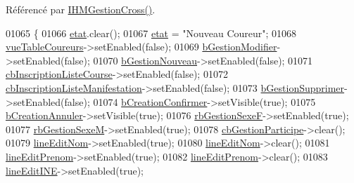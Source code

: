 Référencé par \hyperlink{class_i_h_m_gestion_cross_a2c62fd83326a87456a403f46acc408c8}{I\+H\+M\+Gestion\+Cross()}.


\begin{DoxyCode}
01065 \{
01066     \hyperlink{class_i_h_m_gestion_cross_a5da4390d71dbd5d05cff339f93c7c85a}{etat}.clear();
01067     \hyperlink{class_i_h_m_gestion_cross_a5da4390d71dbd5d05cff339f93c7c85a}{etat} = \textcolor{stringliteral}{"Nouveau Coureur"};
01068     \hyperlink{class_i_h_m_gestion_cross_a4a0ba98c5b671a38d67942254d2329db}{vueTableCoureurs}->setEnabled(\textcolor{keyword}{false});
01069     \hyperlink{class_i_h_m_gestion_cross_a524ced9992dcc4e7ee25b01e30c4c5df}{bGestionModifier}->setEnabled(\textcolor{keyword}{false});
01070     \hyperlink{class_i_h_m_gestion_cross_ab987235a79961d3d186878052a02b21b}{bGestionNouveau}->setEnabled(\textcolor{keyword}{false});
01071     \hyperlink{class_i_h_m_gestion_cross_aff44e6f1a225ee5b55783afe72049f83}{cbInscriptionListeCourse}->setEnabled(\textcolor{keyword}{false});
01072     \hyperlink{class_i_h_m_gestion_cross_a317ffd7cc1c9aa5d6e55c53568e44f98}{cbInscriptionListeManifestation}->setEnabled(\textcolor{keyword}{false});
01073     \hyperlink{class_i_h_m_gestion_cross_adc5bed6caf7f597dd30999bc871e695b}{bGestionSupprimer}->setEnabled(\textcolor{keyword}{false});
01074     \hyperlink{class_i_h_m_gestion_cross_aac8a7363e20bc9ba2f65b7d9b3bc856e}{bCreationConfirmer}->setVisible(\textcolor{keyword}{true});
01075     \hyperlink{class_i_h_m_gestion_cross_a297a77054dc0f54e461c0f9b0382efb3}{bCreationAnnuler}->setVisible(\textcolor{keyword}{true});
01076     \hyperlink{class_i_h_m_gestion_cross_a4474ef47310eb3511befdf1beaa18b56}{rbGestionSexeF}->setEnabled(\textcolor{keyword}{true});
01077     \hyperlink{class_i_h_m_gestion_cross_a7d471a7f96862dcd302f7f8cc52dfea4}{rbGestionSexeM}->setEnabled(\textcolor{keyword}{true});
01078     \hyperlink{class_i_h_m_gestion_cross_a89aff3b1c5d5198dd7aaecd932331e0d}{cbGestionParticipe}->clear();
01079     \hyperlink{class_i_h_m_gestion_cross_a633102626c5dedd575b51a1ba5c6e708}{lineEditNom}->setEnabled(\textcolor{keyword}{true});
01080     \hyperlink{class_i_h_m_gestion_cross_a633102626c5dedd575b51a1ba5c6e708}{lineEditNom}->clear();
01081     \hyperlink{class_i_h_m_gestion_cross_a7bea7529f01cf8ca8f365d418aae52d5}{lineEditPrenom}->setEnabled(\textcolor{keyword}{true});
01082     \hyperlink{class_i_h_m_gestion_cross_a7bea7529f01cf8ca8f365d418aae52d5}{lineEditPrenom}->clear();
01083     \hyperlink{class_i_h_m_gestion_cross_ab6c32fd079f81c4fa0b9ec0b4ef9bb61}{lineEditINE}->setEnabled(\textcolor{keyword}{true});

\end{DoxyCode}
